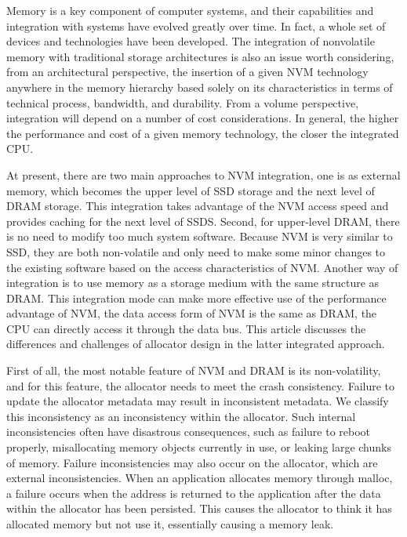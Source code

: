 \documentclass[sigconf]{acmart}
\begin{document}
Memory is a key component of computer systems, and their capabilities and integration with systems have evolved greatly over time. In fact, a whole set of devices and technologies have been developed. The integration of nonvolatile memory with traditional storage architectures is also an issue worth considering, from an architectural perspective, the insertion of a given NVM technology anywhere in the memory hierarchy based solely on its characteristics in terms of technical process, bandwidth, and durability. From a volume perspective, integration will depend on a number of cost considerations. In general, the higher the performance and cost of a given memory technology, the closer the integrated CPU.

At present, there are two main approaches to NVM integration, one is as external memory, which becomes the upper level of SSD storage and the next level of DRAM storage. This integration takes advantage of the NVM access speed and provides caching for the next level of SSDS. Second, for upper-level DRAM, there is no need to modify too much system software. Because NVM is very similar to SSD, they are both non-volatile and only need to make some minor changes to the existing software based on the access characteristics of NVM. Another way of integration is to use memory as a storage medium with the same structure as DRAM. This integration mode can make more effective use of the performance advantage of NVM, the data access form of NVM is the same as DRAM, the CPU can directly access it through the data bus. This article discusses the differences and challenges of allocator design in the latter integrated approach.

First of all, the most notable feature of NVM and DRAM is its non-volatility, and for this feature, the allocator needs to meet the crash consistency. Failure to update the allocator metadata may result in inconsistent metadata. We classify this inconsistency as an inconsistency within the allocator. Such internal inconsistencies often have disastrous consequences, such as failure to reboot properly, misallocating memory objects currently in use, or leaking large chunks of memory. Failure inconsistencies may also occur on the allocator, which are external inconsistencies. When an application allocates memory through malloc, a failure occurs when the address is returned to the application after the data within the allocator has been persisted. This causes the allocator to think it has allocated memory but not use it, essentially causing a memory leak.
\end{document}
